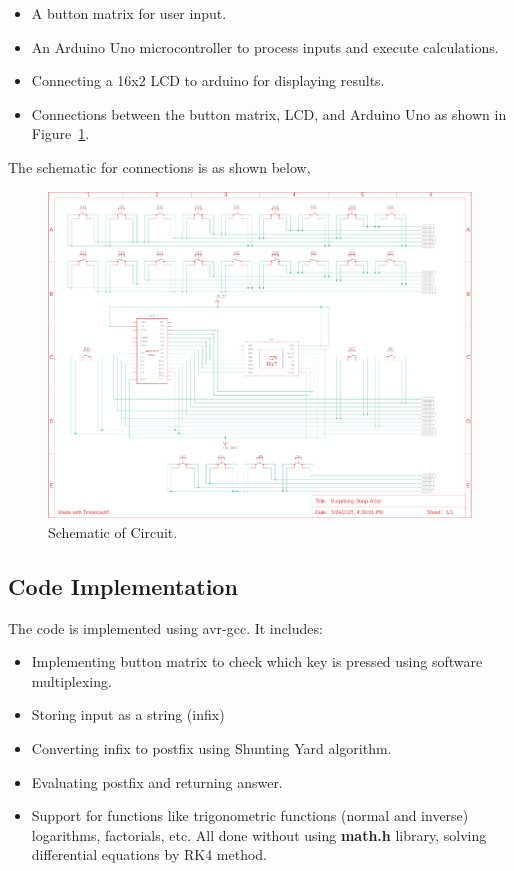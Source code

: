 \documentclass[a4paper,12pt]{article}
\begin{document}
\begin{itemize}
    \item A button matrix for user input.
    \item An Arduino Uno microcontroller to process inputs and execute calculations.
    \item Connecting a 16x2 LCD to arduino for displaying results.
    \item Connections between the button matrix, LCD, and Arduino Uno as shown in Figure~\ref{fig:circuit_schematic}.
\end{itemize}
The schematic for connections is as shown below,
\begin{figure}[H]
    \centering
    \includegraphics[width=\textwidth]{figs/aditya_schematic.png}
    \caption{Schematic of Circuit.}
    \label{fig:circuit_schematic}
\end{figure}
\subsection*{Code Implementation}
The code is implemented using avr-gcc. It includes:
\begin{itemize}
    \item Implementing button matrix to check which key is pressed using software multiplexing.
    \item Storing input as a string (infix) 
    \item Converting infix to postfix using Shunting Yard algorithm.
    \item Evaluating postfix and returning answer.
    \item Support for functions like trigonometric functions (normal and inverse) logarithms, factorials, etc. All done without using \textbf{math.h} library, solving differential equations by RK4 method.
\end{itemize}
\end{document}
